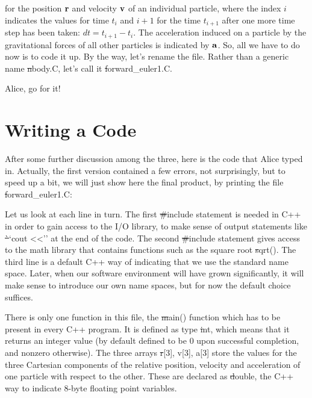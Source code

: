 for the position ${\bf r}$ and velocity ${\bf v}$ of an individual particle,
where the index $i$ indicates the values for time $t_i$ and $i+1$ for
the time $t_{i+1}$ after one more time step has been taken:
$dt = t_{i+1} - t_i$.  The acceleration induced on a particle by the
gravitational forces of all other particles is indicated by ${\bf a}$.
So, all we have to do now is to code it up.  By the way, let's rename
the file.  Rather than a generic name {\st nbody.C}, let's call it
{\st forward\_euler1.C}.

\bob
Alice, go for it!

\cba

\section{Writing a Code}

After some further discussion among the three, here is the code that
Alice typed in.  Actually, the first version contained a few errors,
not surprisingly, but to speed up a bit, we will just show here the
final product, by printing the file {\st forward\_euler1.C}:


Let us look at each line in turn.  The first {\st \#include} statement
is needed in C++ in order to gain access to the I/O library, to make
sense of output statements like {\st ``cout <<''} at the end of the
code.  The second {\st \#include} statement gives access to the math
library that contains functions such as the square root {\st sqrt()}.
The third line is a default C++ way of indicating that we use the
standard name space.  Later, when our software environment will have
grown significantly, it will make sense to introduce our own name
spaces, but for now the default choice suffices.

There is only one function in this file, the {\st main()} function
which has to be present in every C++ program.  It is defined as type
{\st int}, which means that it returns an integer value (by default
defined to be 0 upon successful completion, and nonzero otherwise).
The three arrays {\st r[3], v[3], a[3]} store the values for the
three Cartesian components of the relative position, velocity and
acceleration of one particle with respect to the other.  These are
declared as {\st double}, the C++ way to indicate 8-byte floating
point variables.

